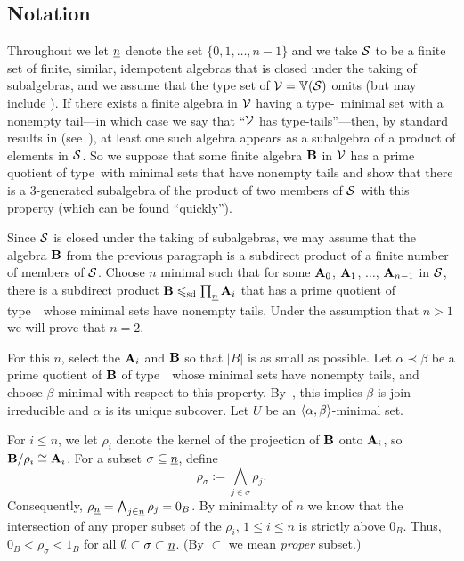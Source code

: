\subsection{Notation}
Throughout we let $\underline{n}$ denote the set $\{0,1,\dots, n-1\}$ and
we take $\mathcal{S}$ to be a finite set of finite,
similar, idempotent algebras that is closed under the taking of
subalgebras, and we assume that the type set of
$\mathcal{V} = \operatorname{\mathbb{V}}(\mathcal{S})$ omits \utyp (but may include \styp).
If there exists a finite algebra in $\mathcal{V}$ having a type-\atyp\ minimal
set with a nonempty tail---in which case we say that
``$\mathcal{V}$ has type-\atyp tails''---then,
by standard results in \tct (see~\cite{HM:1988}),
at least one such algebra appears as a subalgebra of a product of
elements in $\mathcal{S}$.
So we suppose that some finite algebra
$\mathbf{B}$ in $\mathcal{V}$ has a prime quotient of type~\atyp with
minimal sets that have
nonempty tails and show that there is a 3-generated
subalgebra of the
product of two members of $\mathcal{S}$ with this property (which can be found ``quickly'').

Since $\mathcal{S}$ is closed under the taking of subalgebras,
we may assume that the algebra $\mathbf{B}$ from the previous paragraph is a subdirect
product of a finite number of members of $\mathcal{S}$. Choose $n$ minimal such that for
some $\mathbf{A}_0$, $\mathbf{A}_1$, $\dots$, $\mathbf{A}_{n-1}$ in $\mathcal{S}$, there is a subdirect
product $\mathbf{B} \leqslant_{\mathrm{sd}} \prod_{\underline{n}} \mathbf{A}_i$
that has a prime quotient of type~\atyp\ whose minimal sets have
nonempty tails.
Under the assumption that $n > 1$ we will prove that $n = 2$.

For this $n$, select the $\mathbf{A}_i$ and $\mathbf{B}$ so that $|B|$ is as small as possible.
Let $\alpha \prec \beta$ be a prime quotient of $\mathbf{B}$
of type~\atyp\ whose minimal sets have
nonempty tails, and choose $\beta$ minimal with respect to this property.
By~\cite[Lemma 6.2]{HM:1988}, this implies $\beta$ is join
irreducible and $\alpha$ is its unique subcover.
Let $U$ be an $\langle\alpha, \beta\rangle$-minimal set.

For $i \leq n$, we let $\rho_i$ denote the kernel of the projection
of $\mathbf{B}$ onto $\mathbf{A}_i$, so $\mathbf{B}/\rho_i \cong \mathbf{A}_i$.
For a subset $\sigma \subseteq \underline{n}$, define
\[
\rho_\sigma := \bigwedge_{j\in \sigma} \rho_j.
\]
Consequently,
$\rho_{\underline{n}} = \bigwedge_{j\in \underline{n}}\rho_j = 0_{B}$.
By minimality of $n$ we know that the intersection of any  proper subset of the
$\rho_i$, $1 \leq i \leq n$ is strictly above $0_B$.  Thus,
$0_B < \rho_\sigma < 1_B$ for all
$\emptyset \subset \sigma\subset \underline{n}$.
(By $\subset$ we mean \emph{proper} subset.)

